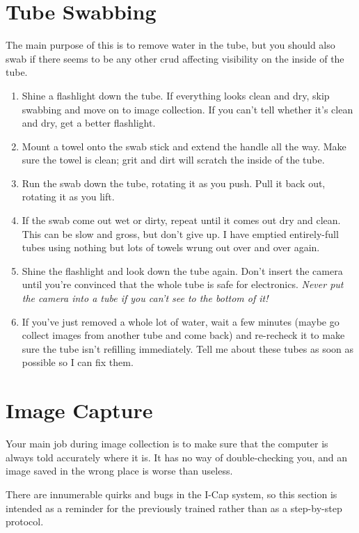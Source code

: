 \documentclass[11pt]{article}
\begin{document}
\section{Tube Swabbing}
	The main purpose of this is to remove water in the tube, but you should also  swab if there seems to be any other crud affecting visibility on the inside of the tube.
	\begin{enumerate}
		\item{Shine a flashlight down the tube. If everything looks clean and dry, skip swabbing and move on to image collection. If you can't tell whether it's clean and dry, get a better flashlight.}
		\item{Mount a towel onto the swab stick and extend the handle all the way. Make sure the towel is clean; grit and dirt will scratch the inside of the tube.}
		\item{Run the swab down the tube, rotating it as you push. Pull it back out, rotating it as you lift.}
		\item{If the swab come out  wet or dirty, repeat until it comes out dry and clean. This can be slow and gross, but don't give up. I have emptied entirely-full tubes using nothing but lots of towels wrung out over and over again.}
		\item{Shine the flashlight and look down the tube again. Don't insert the camera until you're convinced that the whole tube is safe for electronics. \textit{Never put the camera into a tube if you can't see to the bottom of it!}}
		\item{If you've just removed a whole lot of water, wait a few minutes (maybe go collect images from another tube and come back) and re-recheck it to make sure the tube isn't refilling immediately. Tell me about these tubes as soon as possible so I can fix them.}
\end{enumerate}
	
\section{Image Capture}
	Your main job during image collection is to make sure that the computer is always told accurately where it is. It has no way of double-checking you, and an image saved in the wrong place is worse than useless.
	
	There are innumerable quirks and bugs in the I-Cap system, so this section is intended as a reminder for the previously trained rather than as a step-by-step protocol.
	
\end{document}
